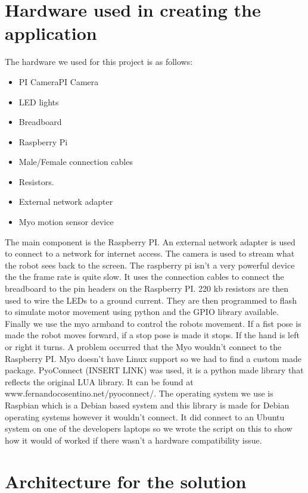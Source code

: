 \documentclass[12pt,a4paper,oneside,openany]{book}
\begin{document}
\chapter*{Hardware used in creating the application}
The hardware we used for this project is as follows:

\begin{itemize}
	\item PI CameraPI Camera 
	\item LED lights
	\item Breadboard
	\item Raspberry Pi
	\item Male/Female connection cables
	\item Resistors.
	\item External network adapter
	\item Myo motion sensor device
\end{itemize}

The main component is the Raspberry PI. An external network adapter is used to connect to a network for internet access. The camera is used to stream what the robot sees back to the screen. The raspberry pi isn’t a very powerful device the the frame rate is quite slow. 
It uses the connection cables to connect the breadboard to the pin headers on the Raspberry PI.  220 kb resistors are then used to wire the LEDs to a ground current. They are then programmed to flash to simulate motor movement using python and the GPIO library available. Finally we use the myo armband to control the robots movement. If a fist pose is made the robot moves forward, if a stop pose is made it stops. If the hand is left or right it turns. A problem occurred that the Myo wouldn’t connect to the Raspberry PI. Myo doesn’t have Linux support so we had to find a custom made package. PyoConnect (INSERT LINK) was used, it is a python made library that reflects the original LUA library. It can be found at www.fernandocosentino.net/pyoconnect/. The operating system we use is Raspbian which is a Debian based system and this library is made for Debian operating systems however it wouldn’t connect. It did connect to an Ubuntu system on one of the developers laptops so we wrote the script on this to show how it would of worked if there wasn’t a hardware compatibility issue.

\chapter*{Architecture for the solution}
\end{document}
